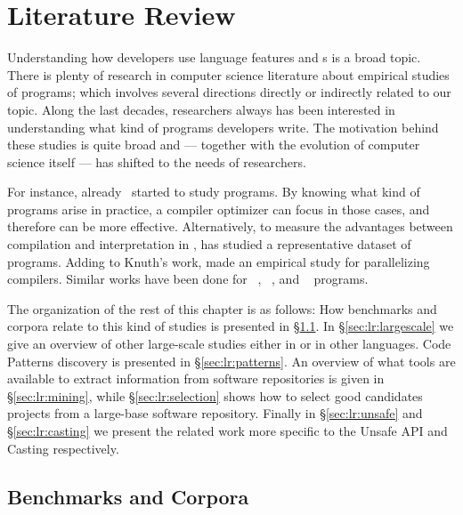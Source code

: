 
\chapter{Literature Review}
\label{cha:literature-review}

Understanding how developers use language features and \api{}s is a broad topic.
There is plenty of research in computer science literature about empirical studies of programs;
which involves several directions directly or indirectly related to our topic.
Along the last decades, researchers always has been interested in understanding what kind of programs developers write.
The motivation behind these studies is quite broad and --- together with the evolution of computer science itself --- has shifted to the needs of researchers.

For instance, already~\cite{knuthEmpiricalStudyFORTRAN1971} started to study \fortran{} programs.
By knowing what kind of programs arise in practice, a compiler optimizer can focus in those cases, and therefore can be more effective.
Alternatively, to measure the advantages between compilation and interpretation in \basic{}, \cite{hammondBASICEvaluationProcessing1977} has studied a representative dataset of programs.
Adding to Knuth's work, \cite{shenEmpiricalStudyFortran1990} made an empirical study for parallelizing compilers.
Similar works have been done for \cobol{}~\cite{salvadoriStaticProfileCOBOL1975,chevanceStaticProfileDynamic1978}, \pascal{}~\cite{cookContextualAnalysisPascal1982}, and \apl{}~\cite{saalPropertiesAPLPrograms1975,saalEmpiricalStudyAPL1977} programs. 

The organization of the rest of this chapter is as follows: 
How benchmarks and corpora relate to this kind of studies is presented in \S\ref{sec:lr:benchmarks}.
In \S\ref{sec:lr:largescale} we give an overview of other large-scale studies either in \java{} or in other languages.
Code Patterns discovery is presented in \S\ref{sec:lr:patterns}.
An overview of what tools are available to extract information from software repositories is given in \S\ref{sec:lr:mining},
while \S\ref{sec:lr:selection} shows how to select good candidates projects from a large-base software repository.
Finally in \S\ref{sec:lr:unsafe} and \S\ref{sec:lr:casting} we present the related work more specific to the Unsafe API and Casting respectively.

\section{Benchmarks and Corpora}
\label{sec:lr:benchmarks}

